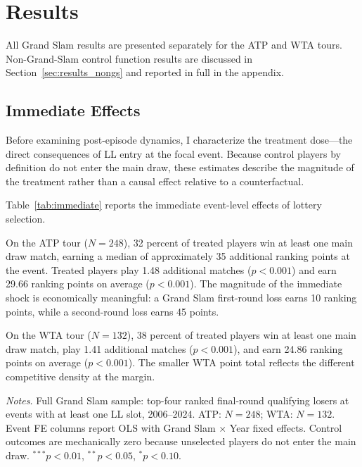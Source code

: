 \section{Results}
\label{sec:results}

All Grand Slam results are presented separately for the ATP and WTA tours. Non-Grand-Slam control function results are discussed in Section~\ref{sec:results_nongs} and reported in full in the appendix.

\subsection{Immediate Effects}
\label{sec:results_immediate}

Before examining post-episode dynamics, I characterize the treatment dose---the direct consequences of LL entry at the focal event. Because control players by definition do not enter the main draw, these estimates describe the magnitude of the treatment rather than a causal effect relative to a counterfactual.

Table~\ref{tab:immediate} reports the immediate event-level effects of lottery selection.

On the ATP tour ($N = 248$), 32 percent of treated players win at least one main draw match, earning a median of approximately 35 additional ranking points at the event. Treated players play 1.48 additional matches ($p < 0.001$) and earn 29.66 ranking points on average ($p < 0.001$). The magnitude of the immediate shock is economically meaningful: a Grand Slam first-round loss earns 10 ranking points, while a second-round loss earns 45 points.

On the WTA tour ($N = 132$), 38 percent of treated players win at least one main draw match, play 1.41 additional matches ($p < 0.001$), and earn 24.86 ranking points on average ($p < 0.001$). The smaller WTA point total reflects the different competitive density at the margin.

\begin{table}[htbp]
\centering
\caption{Grand Slam Lottery: Immediate Event-Level Effects}
\label{tab:immediate}
\begin{threeparttable}
\small

\begin{tablenotes}
\footnotesize
\item \textit{Notes.} Full Grand Slam sample: top-four ranked final-round qualifying losers at events with at least one LL slot, 2006--2024. ATP: $N = 248$; WTA: $N = 132$. Event FE columns report OLS with Grand Slam $\times$ Year fixed effects. Control outcomes are mechanically zero because unselected players do not enter the main draw. $^{***}p<0.01$, $^{**}p<0.05$, $^{*}p<0.10$.
\end{tablenotes}
\end{threeparttable}
\end{table}

